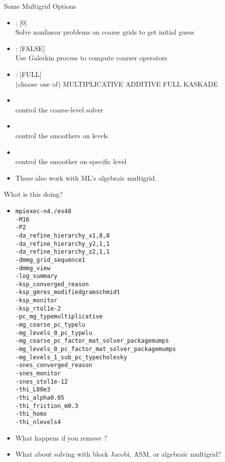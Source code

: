 


\begin{frame}{Some Multigrid Options}
  \begin{itemize}
  \item {}: [0] \\
    Solve nonlinear problems on coarse grids to get initial guess
  \item {}: [FALSE] \\
    Use Galerkin process to compute coarser operators
  \item {}: [FULL] \\
    (choose one of) MULTIPLICATIVE ADDITIVE FULL KASKADE
  \item {} \\
    control the coarse-level solver
  \item {} \\
    control the smoothers on levels
  \item {} \\
    control the smoother on specific level
  \item These also work with ML's algebraic multigrid.
  \end{itemize}
\end{frame}

\begin{frame}{What is this doing?}
\begin{itemize}
\item
\begin{alltt}\footnotesize
mpiexec -n 4 ./ex48
-M 16
-P 2
-da\_refine\_hierarchy\_x 1,8,8 \\
-da\_refine\_hierarchy\_y 2,1,1
-da\_refine\_hierarchy\_z 2,1,1 \\
-dmmg\_grid\_sequence 1
-dmmg\_view
-log\_summary \\
-ksp\_converged\_reason
-ksp\_gmres\_modifiedgramschmidt \\
-ksp\_monitor
-ksp\_rtol 1e-2 \\
-pc\_mg\_type multiplicative \\
-mg\_coarse\_pc\_type lu
-mg\_levels\_0\_pc\_type lu \\
-mg\_coarse\_pc\_factor\_mat\_solver\_package mumps \\
-mg\_levels\_0\_pc\_factor\_mat\_solver\_package mumps \\
-mg\_levels\_1\_sub\_pc\_type cholesky \\
-snes\_converged\_reason
-snes\_monitor
-snes\_stol 1e-12 \\
-thi\_L 80e3
-thi\_alpha 0.05
-thi\_friction\_m 0.3 \\
-thi\_hom x
-thi\_nlevels 4
\end{alltt}
\item What happens if you remove ?
\item What about solving with block Jacobi, ASM, or algebraic multigrid?
\end{itemize}
\end{frame}
